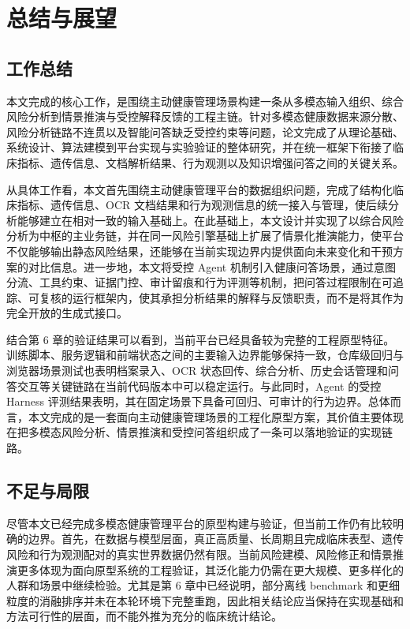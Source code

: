 
\chapter{总结与展望}

\section{工作总结}

本文完成的核心工作，是围绕主动健康管理场景构建一条从多模态输入组织、综合风险分析到情景推演与受控解释反馈的工程主链。针对多模态健康数据来源分散、风险分析链路不连贯以及智能问答缺乏受控约束等问题，论文完成了从理论基础、系统设计、算法建模到平台实现与实验验证的整体研究，并在统一框架下衔接了临床指标、遗传信息、文档解析结果、行为观测以及知识增强问答之间的关键关系。

从具体工作看，本文首先围绕主动健康管理平台的数据组织问题，完成了结构化临床指标、遗传信息、OCR 文档结果和行为观测信息的统一接入与管理，使后续分析能够建立在相对一致的输入基础上。在此基础上，本文设计并实现了以综合风险分析为中枢的主业务链，并在同一风险引擎基础上扩展了情景化推演能力，使平台不仅能够输出静态风险结果，还能够在当前实现边界内提供面向未来变化和干预方案的对比信息。进一步地，本文将受控 Agent 机制引入健康问答场景，通过意图分流、工具约束、证据门控、审计留痕和行为评测等机制，把问答过程限制在可追踪、可复核的运行框架内，使其承担分析结果的解释与反馈职责，而不是将其作为完全开放的生成式接口。

结合第 6 章的验证结果可以看到，当前平台已经具备较为完整的工程原型特征。训练脚本、服务逻辑和前端状态之间的主要输入边界能够保持一致，仓库级回归与浏览器场景测试也表明档案录入、OCR 状态回传、综合分析、历史会话管理和问答交互等关键链路在当前代码版本中可以稳定运行。与此同时，Agent 的受控 Harness 评测结果表明，其在固定场景下具备可回归、可审计的行为边界。总体而言，本文完成的是一套面向主动健康管理场景的工程化原型方案，其价值主要体现在把多模态风险分析、情景推演和受控问答组织成了一条可以落地验证的实现链路。

\section{不足与局限}

尽管本文已经完成多模态健康管理平台的原型构建与验证，但当前工作仍有比较明确的边界。首先，在数据与模型层面，真正高质量、长周期且完成临床表型、遗传风险和行为观测配对的真实世界数据仍然有限。当前风险建模、风险修正和情景推演更多体现为面向原型系统的工程验证，其泛化能力仍需在更大规模、更多样化的人群和场景中继续检验。尤其是第 6 章中已经说明，部分离线 benchmark 和更细粒度的消融排序并未在本轮环境下完整重跑，因此相关结论应当保持在实现基础和方法可行性的层面，而不能外推为充分的临床统计结论。

